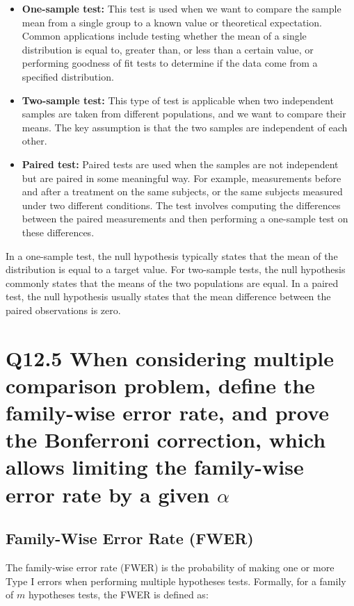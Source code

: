 \documentclass[11pt]{article}
\begin{document}
\begin{itemize}
    \item \textbf{One-sample test:} This test is used when we want to compare the sample mean from a single group to a known value or theoretical expectation. Common applications include testing whether the mean of a single distribution is equal to, greater than, or less than a certain value, or performing goodness of fit tests to determine if the data come from a specified distribution.

    \item \textbf{Two-sample test:} This type of test is applicable when two independent samples are taken from different populations, and we want to compare their means. The key assumption is that the two samples are independent of each other.

    \item \textbf{Paired test:} Paired tests are used when the samples are not independent but are paired in some meaningful way. For example, measurements before and after a treatment on the same subjects, or the same subjects measured under two different conditions. The test involves computing the differences between the paired measurements and then performing a one-sample test on these differences.
\end{itemize}

In a one-sample test, the null hypothesis typically states that the mean of the distribution is equal to a target value. For two-sample tests, the null hypothesis commonly states that the means of the two populations are equal. In a paired test, the null hypothesis usually states that the mean difference between the paired observations is zero.

\section{Q12.5 When considering multiple comparison problem, define the family-wise error rate, and prove the Bonferroni correction, which allows limiting the family-wise error rate by a given $\alpha$}

\subsection*{Family-Wise Error Rate (FWER)}

The family-wise error rate (FWER) is the probability of making one or more Type I errors when performing multiple hypotheses tests. Formally, for a family of $m$ hypotheses tests, the FWER is defined as:
\end{document}
